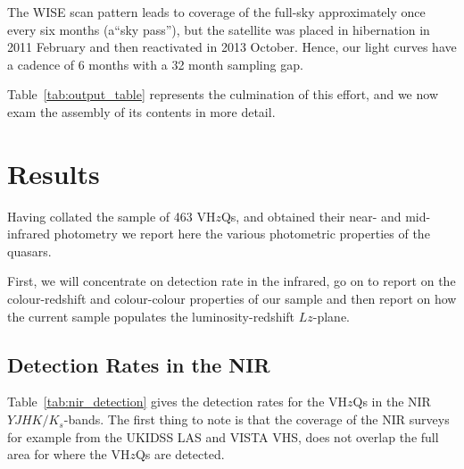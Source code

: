 \documentclass[usenatbib]{mnras}
\begin{document}
The WISE scan pattern leads to coverage of the full-sky approximately
once every six months (a``sky pass''), but the satellite was placed in
hibernation in 2011 February and then reactivated in 2013
October. Hence, our light curves have a cadence of 6 months with a 32
month sampling gap.

Table~\ref{tab:output_table} represents the culmination of this
effort, and we now exam the assembly of its contents in more detail.
\begin{landscape}
      
\end{landscape}



\section{Results}
Having collated the sample of 463 VH$z$Qs, and obtained their near-
and mid-infrared photometry we report here the various photometric
properties of the quasars.

First, we will concentrate on detection rate in the infrared, go on to
report on the colour-redshift and colour-colour properties of our sample
and then report on how the current sample populates the
luminosity-redshift $Lz$-plane.

\subsection{Detection Rates in the NIR}
Table~\ref{tab:nir_detection} gives the detection rates for the 
VH$z$Qs in the NIR $YJHK/K_{s}$-bands. 
The first thing to note is that the coverage of the NIR surveys 
for example from the UKIDSS LAS and VISTA VHS, does
not overlap the full area for where the VH$z$Qs are detected. 
\end{document}
